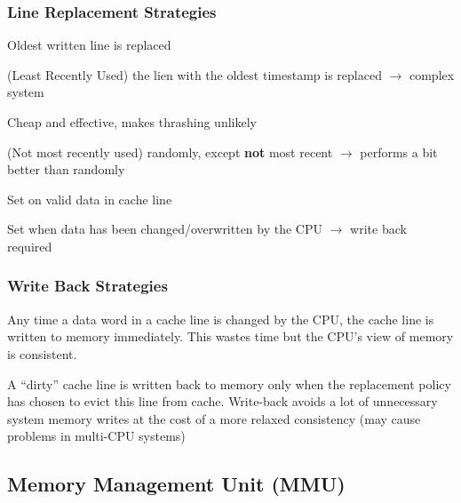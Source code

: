\documentclass[
  10pt,
  a4paper,
]{article}
\begin{document}
\begin{multicols*}{2}
\subsubsection{Line Replacement
Strategies}\label{line-replacement-strategies}

{\small\begin{description}[style=sameline,parsep=0mm,labelsep=4pt]
\item[\textbf{FIFO}] Oldest written line is replaced 
\item[\textbf{LRU}] (Least Recently Used) the lien with the oldest timestamp is replaced $\rightarrow$ complex system
\item[\textbf{Random}] Cheap and effective, makes thrashing unlikely 
\item[\textbf{NMRU}] (Not most recently used) randomly, except \textbf{not} most recent $\rightarrow$ performs a bit better than randomly
\item[\textbf{Valid Bit}] Set on valid data in cache line
\item[\textbf{Dirty Bit}] Set when data has been changed/overwritten by the CPU $\rightarrow$ write back required
\end{description}}

\subsubsection{Write Back Strategies}\label{write-back-strategies}

{\small\begin{description}[style=sameline,parsep=0mm,labelsep=4pt]
\item[\textbf{Write-Through}] Any time a data word in a cache line is changed by the CPU, the cache line is written to memory immediately. This wastes time but the CPU’s view of memory is consistent.
\item[\textbf{Write-Back}] A “dirty” cache line is written back to memory only when the replacement policy has chosen to evict this line from cache. {\footnotesize Write-back avoids a lot of unnecessary system memory writes at the cost of a more relaxed consistency (may cause problems in multi-CPU systems)}
\end{description}}

\subsection{Memory Management Unit
(MMU)}\label{memory-management-unit-mmu}


\end{multicols*}
\end{document}
